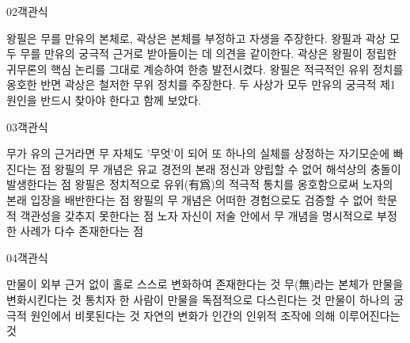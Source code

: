 \documentclass[fs85,seriesWit]{korfarm-base}
\begin{document}
\begin{kfQBlock}{02}{객관식}
\begin{kfChoices}
\kfChoice 왕필은 무를 만유의 본체로, 곽상은 본체를 부정하고 자생을 주장한다.
\kfChoice 왕필과 곽상 모두 무를 만유의 궁극적 근거로 받아들이는 데 의견을 같이한다.
\kfChoice 곽상은 왕필이 정립한 귀무론의 핵심 논리를 그대로 계승하여 한층 발전시켰다.
\kfChoice 왕필은 적극적인 유위 정치를 옹호한 반면 곽상은 철저한 무위 정치를 주장한다.
\kfChoice 두 사상가 모두 만유의 궁극적 제1원인을 반드시 찾아야 한다고 함께 보았다.
\end{kfChoices}
\end{kfQBlock}

\begin{kfQBlock}{03}{객관식}
\begin{kfChoices}
\kfChoice 무가 유의 근거라면 무 자체도 '무엇'이 되어 또 하나의 실체를 상정하는 자기모순에 빠진다는 점
\kfChoice 왕필의 무 개념은 유교 경전의 본래 정신과 양립할 수 없어 해석상의 충돌이 발생한다는 점
\kfChoice 왕필은 정치적으로 유위(有爲)의 적극적 통치를 옹호함으로써 노자의 본래 입장을 배반한다는 점
\kfChoice 왕필의 무 개념은 어떠한 경험으로도 검증할 수 없어 학문적 객관성을 갖추지 못한다는 점
\kfChoice 노자 자신이 저술 안에서 무 개념을 명시적으로 부정한 사례가 다수 존재한다는 점
\end{kfChoices}
\end{kfQBlock}

\begin{kfQBlock}{04}{객관식}
\begin{kfChoices}
\kfChoice 만물이 외부 근거 없이 홀로 스스로 변화하여 존재한다는 것
\kfChoice 무(無)라는 본체가 만물을 변화시킨다는 것
\kfChoice 통치자 한 사람이 만물을 독점적으로 다스린다는 것
\kfChoice 만물이 하나의 궁극적 원인에서 비롯된다는 것
\kfChoice 자연의 변화가 인간의 인위적 조작에 의해 이루어진다는 것
\end{kfChoices}
\end{kfQBlock}

\kfEndMC
\end{document}
